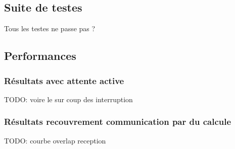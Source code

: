 \subsection{Suite de testes}

Tous les testes ne passe pas ?

\subsection{Performances}

\subsubsection{Résultats avec attente active}

TODO: voire le sur coup des interruption

\subsubsection{Résultats recouvrement communication par du calcule}

TODO: courbe overlap reception